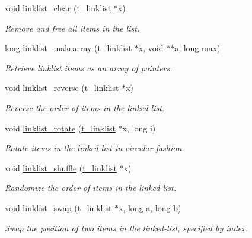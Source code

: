 \begin{DoxyCompactItemize}
void \hyperlink{group__linklist_ga551da85a8531e5785a4b748d8a86301a}{linklist\_\-clear} (\hyperlink{structt__linklist}{t\_\-linklist} $\ast$x)
\begin{DoxyCompactList}\small\item\em Remove and free all items in the list. \item\end{DoxyCompactList}\item 
long \hyperlink{group__linklist_ga49aa766d6a1a63de1491f9bdfb3cfe73}{linklist\_\-makearray} (\hyperlink{structt__linklist}{t\_\-linklist} $\ast$x, void $\ast$$\ast$a, long max)
\begin{DoxyCompactList}\small\item\em Retrieve linklist items as an array of pointers. \item\end{DoxyCompactList}\item 
void \hyperlink{group__linklist_ga4ca32e817270576a9c1137e86f33c3d6}{linklist\_\-reverse} (\hyperlink{structt__linklist}{t\_\-linklist} $\ast$x)
\begin{DoxyCompactList}\small\item\em Reverse the order of items in the linked-\/list. \item\end{DoxyCompactList}\item 
void \hyperlink{group__linklist_ga728b9e635de257787b721dddaac8e01f}{linklist\_\-rotate} (\hyperlink{structt__linklist}{t\_\-linklist} $\ast$x, long i)
\begin{DoxyCompactList}\small\item\em Rotate items in the linked list in circular fashion. \item\end{DoxyCompactList}\item 
void \hyperlink{group__linklist_ga58a2e5fba8b3b084a3940a23fbd3a4a1}{linklist\_\-shuffle} (\hyperlink{structt__linklist}{t\_\-linklist} $\ast$x)
\begin{DoxyCompactList}\small\item\em Randomize the order of items in the linked-\/list. \item\end{DoxyCompactList}\item 
void \hyperlink{group__linklist_ga42d158b9f76d83f58cf6780aeb9b208a}{linklist\_\-swap} (\hyperlink{structt__linklist}{t\_\-linklist} $\ast$x, long a, long b)
\begin{DoxyCompactList}\small\item\em Swap the position of two items in the linked-\/list, specified by index. \item\end{DoxyCompactList}\item 
$$
\end{DoxyCompactItemize}
